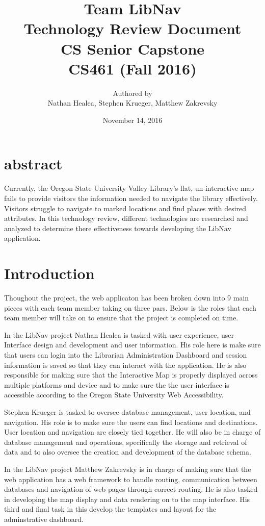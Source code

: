 \documentclass[letterpaper,10pt,titlepage, onecolumn, compsoc]{IEEEtran}
\title{Team LibNav \\ Technology Review Document \\ CS Senior Capstone \\ \vspace{2mm}\small CS461 (Fall 2016)}
\author{Authored by \\ Nathan Healea, Stephen Krueger, Matthew Zakrevsky}
\date{November 14, 2016}
\begin{document}
\maketitle



\section*{abstract}
Currently, the Oregon State University Valley Library's flat, un-interactive map fails to provide visitors the information needed to navigate the library effectively. Visitors struggle to navigate to marked locations and find places with desired attributes. In this technology review, different technologies are researched and analyzed to determine there effectiveness towards developing the LibNav application. 
\newpage

\tableofcontents
\newpage


\newpage

\section{Introduction}
Thoughout the project, the web applicaton has been broken down into 9 main pieces with each team member taking on three pars. Below is the roles that each team member will take on to ensure that the project is completed on time.

In the LibNav project Nathan Healea is tasked with user experience, user Interface design and development and user information. His role here is make sure that users can login into the Librarian Administration Dashboard and session information is saved so that they can interact with the application. He is also responsible for making sure that the Interactive Map is properly displayed across multiple platforms and device and to make sure the the user interface is accessible according to the Oregon State University Web Accessibility.

Stephen Krueger is tasked to oversee database management, user location, and navigation. His role is to make sure the users can find  locations and destinations. User location and navigation are closely tied together. He will also be in charge of database management and operations, specifically the storage and retrieval of data and to also oversee the creation and development of the database schema. 

In the LibNav project Matthew Zakrevsky is in charge of making sure that the web application has a web framework to handle routing, communication between databases and navigation of web pages through correct routing. He is also tasked in developing the map display and data rendering on to the map interface. His third and final task in this develop the templates and layout for the adminstrative dashboard.
\end{document}
